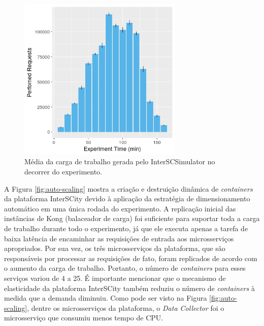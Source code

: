 \begin{figure}[ht]
	\centering
	\includegraphics[width=0.7\textwidth]{figuras/workload.png}
    \caption{Média da carga de trabalho gerada pelo InterSCSimulator no decorrer do experimento.}
	\label{fig:workload}
\end{figure}

A Figura \ref{fig:auto-scaling} mostra a criação e destruição dinâmica de \textit{containers} da plataforma InterSCity devido à aplicação da estratégia de dimensionamento automático em uma única rodada
do experimento.
A replicação inicial das instâncias de Kong (balaceador de carga) foi suficiente para suportar toda a carga de trabalho durante todo o experimento, já que ele executa apenas a tarefa de baixa latência
de encaminhar as requisições de entrada aos microsserviços apropriados.
Por sua vez, os três microsserviços da plataforma, que são responsáveis por processar as requisições de fato, foram replicados de acordo com o aumento da carga de trabalho.
Portanto, o número de \textit{containers} para esses serviços variou de 4 a 25.
É importante mencionar que o mecanismo de elasticidade da plataforma InterSCity também reduziu o número de \textit{containers} à medida que a demanda diminuiu.
Como pode ser visto na Figura \ref{fig:auto-scaling}, dentre os microsserviços da plataforma, o \textit{Data Collector} foi o microsserviço que consumiu menos tempo de CPU.


